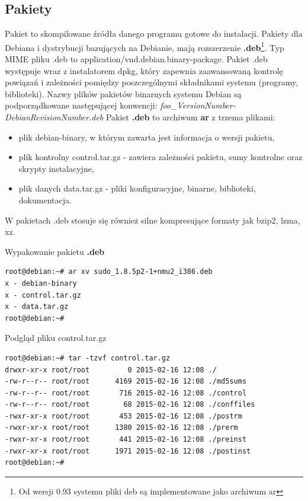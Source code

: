 

\subsection{Pakiety}

Pakiet to skompilowane źródła danego programu gotowe do instalacji. Pakiety dla Debiana i dystrybucji bazujących na Debianie, mają rozszerzenie \textbf{.deb}\footnote{Od wersji 0.93 systemu pliki deb są implementowane jako archiwum ar}. Typ MIME pliku .deb to application/vnd.debian.binary-package. Pakiet .deb występuje wraz z instalatorem dpkg, który zapewnia zaawansowaną kontrolę powiązań i zależności pomiędzy poszczególnymi składnikami systemu (programy, biblioteki).
Nazwy plików pakietów binarnych systemu Debian są podporządkowane następującej konwencji: \textit{foo\_VersionNumber-DebianRevisionNumber.deb}
\newline
Pakiet \textbf{.deb} to archiwum \textbf{ar} z trzema plikami:

\begin{itemize}
	\item plik debian-binary, w którym zawarta jest informacja o wersji pakietu,
	\item plik kontrolny control.tar.gz - zawiera zależności pakietu, sumy kontrolne oraz skrypty instalacyjne, 
	\item plik danych data.tar.gz - pliki konfiguracyjne, binarne, biblioteki, dokumentacja. 
\end{itemize}
W pakietach .deb stosuje się również silne kompresujące formaty jak bzip2, lzma, xz.
\newline 

Wypakowanie pakietu \textbf{.deb}
\begin{lstlisting}
root@debian:~# ar xv sudo_1.8.5p2-1+nmu2_i386.deb 
x - debian-binary
x - control.tar.gz
x - data.tar.gz
root@debian:~# 
\end{lstlisting}

\newpage
Podgląd pliku control.tar.gz
\begin{lstlisting}
root@debian:~# tar -tzvf control.tar.gz 
drwxr-xr-x root/root         0 2015-02-16 12:08 ./
-rw-r--r-- root/root      4169 2015-02-16 12:08 ./md5sums
-rw-r--r-- root/root       716 2015-02-16 12:08 ./control
-rw-r--r-- root/root        68 2015-02-16 12:08 ./conffiles
-rwxr-xr-x root/root       453 2015-02-16 12:08 ./postrm
-rwxr-xr-x root/root      1380 2015-02-16 12:08 ./prerm
-rwxr-xr-x root/root       441 2015-02-16 12:08 ./preinst
-rwxr-xr-x root/root      1971 2015-02-16 12:08 ./postinst
root@debian:~# 
\end{lstlisting}

